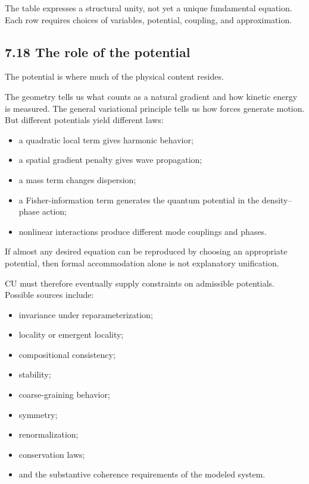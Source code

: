\documentclass[
  11pt,
]{article}
\providecommand{\tightlist}{%
  \setlength{\itemsep}{0pt}\setlength{\parskip}{0pt}}
\begin{document}
The table expresses a structural unity, not yet a unique fundamental
equation. Each row requires choices of variables, potential, coupling,
and approximation.

\subsection{7.18 The role of the
potential}\label{the-role-of-the-potential}

The potential is where much of the physical content resides.

The geometry tells us what counts as a natural gradient and how kinetic
energy is measured. The general variational principle tells us how
forces generate motion. But different potentials yield different laws:

\begin{itemize}
\tightlist
\item
  a quadratic local term gives harmonic behavior;
\item
  a spatial gradient penalty gives wave propagation;
\item
  a mass term changes dispersion;
\item
  a Fisher-information term generates the quantum potential in the
  density--phase action;
\item
  nonlinear interactions produce different mode couplings and phases.
\end{itemize}

If almost any desired equation can be reproduced by choosing an
appropriate potential, then formal accommodation alone is not
explanatory unification.

CU must therefore eventually supply constraints on admissible
potentials. Possible sources include:

\begin{itemize}
\tightlist
\item
  invariance under reparameterization;
\item
  locality or emergent locality;
\item
  compositional consistency;
\item
  stability;
\item
  coarse-graining behavior;
\item
  symmetry;
\item
  renormalization;
\item
  conservation laws;
\item
  and the substantive coherence requirements of the modeled system.
\end{itemize}
\end{document}
